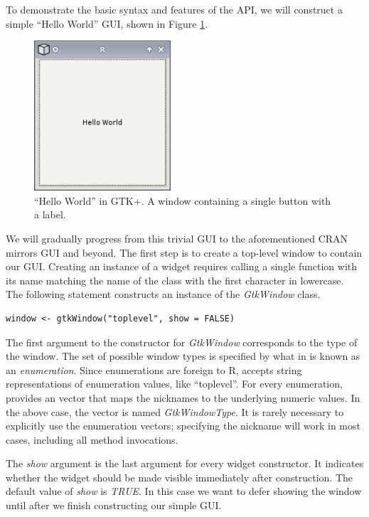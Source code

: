 \documentclass[article]{jss}
\begin{document}
To demonstrate the basic syntax and
features of the  API, we will construct a simple ``Hello World'' GUI,
shown in Figure \ref{fig:hello-world}. 

\begin{figure}
\begin{center}
\includegraphics[width=2in]{hello-world.png}
\caption{\label{fig:hello-world}``Hello World'' in GTK+. 
A window containing a single button with a label.}
\end{center}
\end{figure}

We will gradually 
progress from this trivial GUI to the aforementioned CRAN mirrors GUI and beyond.
The first step is to create a top-level window to contain our GUI.
Creating an instance of a  widget requires calling a single  
function with its name matching the name of the class with the first character in 
lowercase. The following statement constructs an instance of the \emph{GtkWindow} class.
\begin{verbatim}
window <- gtkWindow("toplevel", show = FALSE)
\end{verbatim}

The first argument to the constructor for \emph{GtkWindow} corresponds to the  
type of the window. The set of possible window types is specified by what in 
 is known as an \emph{enumeration}. Since enumerations are foreign 
to R,  accepts string representations of enumeration values, like 
``toplevel''. For every  enumeration,  provides an 
 vector that maps the nicknames to the underlying numeric values. 
In the above case, the vector is named \emph{GtkWindowType}. It is rarely 
necessary to explicitly use the enumeration vectors; specifying the nickname 
will work in most cases, including all method invocations.

The \emph{show} argument is the last argument for every widget constructor. It
indicates whether the widget should be made visible immediately after construction.
The default value of \emph{show} is \emph{TRUE}. In this case we want to
defer showing the window until after we finish constructing our simple GUI.
\end{document}
